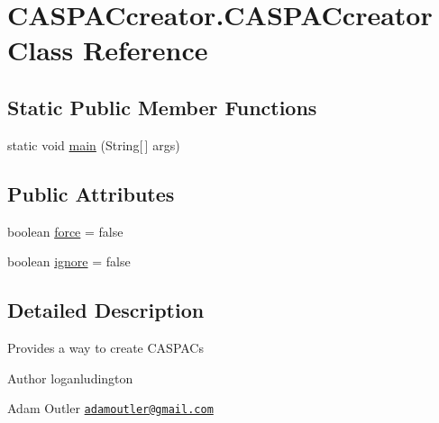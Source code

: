 \hypertarget{class_c_a_s_p_a_ccreator_1_1_c_a_s_p_a_ccreator}{\section{C\-A\-S\-P\-A\-Ccreator.\-C\-A\-S\-P\-A\-Ccreator Class Reference}
\label{class_c_a_s_p_a_ccreator_1_1_c_a_s_p_a_ccreator}
}
\subsection*{Static Public Member Functions}
\begin{DoxyCompactItemize}
\item 
static void \hyperlink{class_c_a_s_p_a_ccreator_1_1_c_a_s_p_a_ccreator_a079a7e649b9589a4f7f7a26d30e3c484}{main} (String\mbox{[}$\,$\mbox{]} args)
\end{DoxyCompactItemize}
\subsection*{Public Attributes}
\begin{DoxyCompactItemize}
\item 
boolean \hyperlink{class_c_a_s_p_a_ccreator_1_1_c_a_s_p_a_ccreator_a06739ae603ad3ff397ecf3efb8d2ced5}{force} = false
\item 
boolean \hyperlink{class_c_a_s_p_a_ccreator_1_1_c_a_s_p_a_ccreator_af131ba1e4eed877fa18018c5b7304255}{ignore} = false
\end{DoxyCompactItemize}


\subsection{Detailed Description}
Provides a way to create C\-A\-S\-P\-A\-Cs \begin{DoxyAuthor}{Author}
loganludington 

Adam Outler \href{mailto:adamoutler@gmail.com}{\tt adamoutler@gmail.\-com} 
\end{DoxyAuthor}



